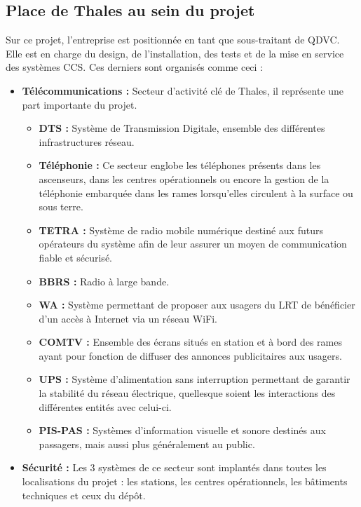\subsection{Place de Thales au sein du projet}

Sur ce projet, l'entreprise est positionnée en tant que sous-traitant de QDVC. Elle est en charge du design, de l'installation, des tests et de la mise en service des systèmes \gls{CCS}. Ces derniers sont organisés comme ceci :

\begin{itemize}
\item \textbf{Télécommunications :} Secteur d'activité clé de Thales, il représente une part importante du projet.
\begin{itemize}
\item \textbf{\gls{DTS} :} Système de Transmission Digitale, ensemble des différentes infrastructures réseau.
\item \textbf{Téléphonie :} Ce secteur englobe les téléphones présents dans les ascenseurs, dans les centres opérationnels ou encore la gestion de la téléphonie embarquée dans les rames lorsqu'elles circulent à la surface ou sous terre.
\item \textbf{\gls{TETRA} :} Système de radio mobile numérique destiné aux futurs opérateurs du système afin de leur assurer un moyen de communication fiable et sécurisé.
\item \textbf{BBRS :} Radio à large bande. %
\item \textbf{\gls{WA} :} Système permettant de proposer aux usagers du LRT de bénéficier d'un accès à Internet via un réseau WiFi.
\item \textbf{\gls{COMTV} :} Ensemble des écrans situés en station et à bord des rames ayant pour fonction de diffuser des annonces publicitaires aux usagers.
\item \textbf{\gls{UPS} :} Système d'alimentation sans interruption permettant de garantir la stabilité du réseau électrique, quellesque soient les interactions des différentes entités avec celui-ci.
\item \textbf{\gls{PIS}-\gls{PAS} :} Systèmes d'information visuelle et sonore destinés aux passagers, mais aussi plus généralement au public.
\end{itemize}
\item \textbf{Sécurité :} Les 3 systèmes de ce secteur sont implantés dans toutes les localisations du projet : les stations, les centres opérationnels, les bâtiments techniques et ceux du dépôt.
\begin{itemize}

\end{itemize}
\end{itemize}

